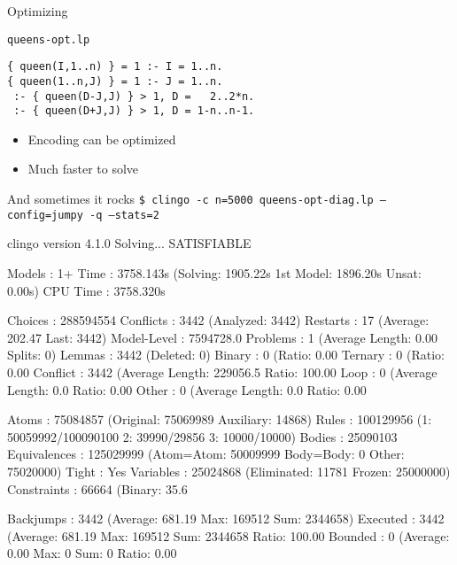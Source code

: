 \begin{frame}[fragile]{Optimizing}
  \begin{block}{\texttt{queens-opt.lp}}
\begin{lstlisting}
{ queen(I,1..n) } = 1 :- I = 1..n.
{ queen(1..n,J) } = 1 :- J = 1..n.
 :- { queen(D-J,J) } > 1, D =   2..2*n.
 :- { queen(D+J,J) } > 1, D = 1-n..n-1.
\end{lstlisting}
  \end{block}
  \begin{itemize}
  \item Encoding can be optimized
  \item Much faster to solve
  \end{itemize}
\end{frame}
\begin{frame}[fragile,shrink=1]{And sometimes it rocks}
  \mbox{\Large\texttt{\$ clingo -c n=5000 queens-opt-diag.lp --config=jumpy -q --stats=2}}
  \pause
\begin{semiverbatim}
clingo version 4.1.0
Solving...
SATISFIABLE

Models       : 1+
Time         : 3758.143s (Solving: 1905.22s 1st Model: 1896.20s Unsat: 0.00s)
CPU Time     : 3758.320s

Choices      : 288594554
Conflicts    : 3442   (Analyzed: 3442)
Restarts     : 17     (Average: 202.47 Last: 3442)
Model-Level  : 7594728.0
Problems     : 1      (Average Length: 0.00 Splits: 0)
Lemmas       : 3442   (Deleted: 0)
  Binary     : 0      (Ratio:   0.00%
  Ternary    : 0      (Ratio:   0.00%
  Conflict   : 3442   (Average Length: 229056.5 Ratio: 100.00%
  Loop       : 0      (Average Length:    0.0 Ratio:   0.00%
  Other      : 0      (Average Length:    0.0 Ratio:   0.00%

Atoms        : 75084857 (Original: 75069989 Auxiliary: 14868)
Rules        : 100129956 (1: 50059992/100090100 2: 39990/29856 3: 10000/10000)
Bodies       : 25090103
Equivalences : 125029999 (Atom=Atom: 50009999 Body=Body: 0 Other: 75020000)
Tight        : Yes
Variables    : 25024868 (Eliminated: 11781 Frozen: 25000000)
Constraints  : 66664  (Binary: 35.6%

Backjumps    : 3442   (Average: 681.19 Max: 169512 Sum: 2344658)
  Executed   : 3442   (Average: 681.19 Max: 169512 Sum: 2344658 Ratio: 100.00%
  Bounded    : 0      (Average:  0.00 Max:   0 Sum:      0 Ratio:   0.00%
\end{semiverbatim}
\end{frame}
%
